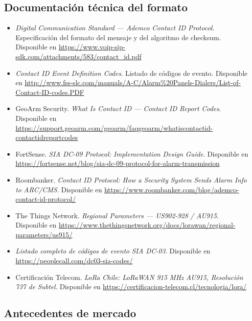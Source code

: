 \subsection*{Documentación técnica del formato}

\begin{itemize}[leftmargin=1.2em]
\item \emph{Digital Communication Standard --- Ademco Contact ID Protocol}. Especificación del formato
del mensaje y del algoritmo de checksum. Disponible en
\url{https://www.voip-sip-sdk.com/attachments/583/contact_id.pdf}

\item \emph{Contact ID Event Definition Codes}. Listado de códigos de evento. Disponible en
\url{http://www.fss-slc.com/manuals/A-C/Alarm\%20Panels-Dialers/List-of-Contact-ID-codes.PDF}

\item GeoArm Security. \emph{What Is Contact ID --- Contact ID Report Codes}. Disponible en
\url{https://support.geoarm.com/geoarm/faqgeoarm/whatiscontactid-contactidreportcodes}

\item FortSense. \emph{SIA DC-09 Protocol: Implementation Design Guide}. Disponible en
\url{https://fortsense.net/blog/sia-dc-09-protocol-for-alarm-transmission}

\item Roombanker. \emph{Contact ID Protocol: How a Security System Sends Alarm Info to ARC/CMS}.
Disponible en \url{https://www.roombanker.com/blog/ademco-contact-id-protocol/}

\item The Things Network. \emph{Regional Parameters --- US902-928 / AU915}. Disponible en
\url{https://www.thethingsnetwork.org/docs/lorawan/regional-parameters/us915/}

\item \emph{Listado completo de códigos de evento SIA DC-03}. Disponible en
\url{https://peoplecall.com/dc03-sia-codes/}

\item Certificación Telecom. \emph{LoRa Chile: LoRaWAN 915 MHz AU915, Resolución 737 de Subtel}.
Disponible en \url{https://certificacion-telecom.cl/tecnologia/lora/}
\end{itemize}

\subsection*{Antecedentes de mercado}

